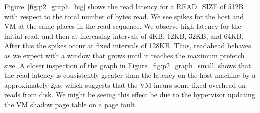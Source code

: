 Figure~\ref{fig:p2_graph_big} shows the read latency for a READ\_SIZE of 512B with
respect to the total number of bytes read. We see spikes for the host and VM at the
same places in the read sequence. We observe high latency for the initial read, and
then at increasing intervals of 4KB, 12KB, 32KB, and 64KB. After this the spikes 
occur at fixed intervals of 128KB. Thus, readahead behaves as we expect with a
window that grows until it reaches the maximum prefetch size. 
A closer inspection of the graph in Figure~\ref{fig:p2_graph_small} shows that the 
read latency is consistently greater than the latency on the host machine by a 
approximately 2$\mu$s, which suggests that the VM incurs some fixed overhead on 
reads from disk. We might be seeing this effect be due to the hypervisor updating the VM shadow page 
table on a page fault.




